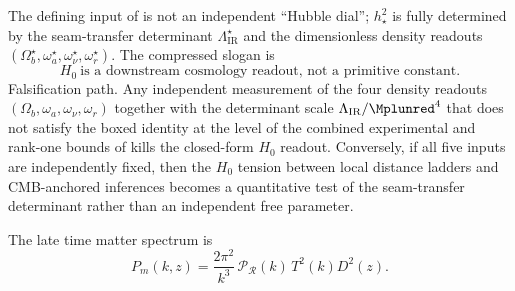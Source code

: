 \begin{remark}
The defining input of  is not an independent ``Hubble dial'';
$h_\star^2$ is fully determined by the seam-transfer determinant $\Lambda_{\mathrm{IR}}^\star$ and
the dimensionless density readouts $(\Omega_b^\star,\omega_a^\star,\omega_\nu^\star,\omega_r^\star)$.
The compressed slogan is
\[
\boxed{\;H_0\ \text{is a downstream cosmology readout, not a primitive constant.}\;}
\]
Falsification path. Any independent measurement of the four density readouts
$(\Omega_b,\omega_a,\omega_\nu,\omega_r)$ together with the determinant scale
$\Lambda_{\mathrm{IR}}/\Mplunred^4$ that does not satisfy the boxed identity at the level of the
combined experimental and rank-one bounds of  kills the closed-form
$H_0$ readout. Conversely, if all five inputs are independently fixed, then the
$H_0$ tension between local distance ladders and CMB-anchored inferences becomes a quantitative test
of the seam-transfer determinant rather than an independent free parameter.
\end{remark}

\begin{conjecture}
\label{cor:matter_power_spectrum_readout}
The late time matter spectrum is
\[
P_m(k,z)=\frac{2\pi^2}{k^3}\,\mathcal P_{\mathcal R}(k)\,T^2(k)D^2(z).
\]
\end{conjecture}

